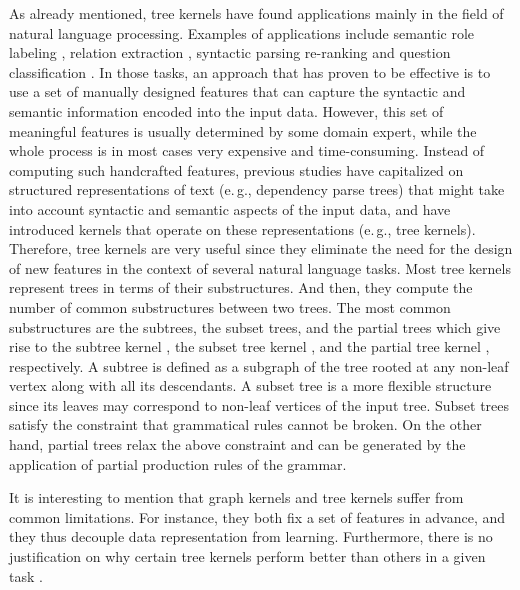 \documentclass[twoside,11pt]{article}
\newcommand{\eg}{e.\,g., }
\begin{document}
As already mentioned, tree kernels have found applications mainly in the field of natural language processing.
Examples of applications include semantic role labeling , relation extraction , syntactic parsing re-ranking  and question classification .
In those tasks, an approach that has proven to be effective is to use a set of manually designed features that can capture the syntactic and semantic information encoded into the input data.
However, this set of meaningful features is usually determined by some domain expert, while the whole process is in most cases very expensive and time-consuming.
Instead of computing such handcrafted features, previous studies have capitalized on structured representations of text (\eg dependency parse trees) that might take into account syntactic and semantic aspects of the input data, and have introduced kernels that operate on these representations (\eg tree kernels).
Therefore, tree kernels are very useful since they eliminate the need for the design of new features in the context of several natural language tasks.
Most tree kernels represent trees in terms of their substructures.
And then, they compute the number of common substructures between two trees.
The most common substructures are the subtrees, the subset trees, and the partial trees which give rise to the subtree kernel , the subset tree kernel , and the partial tree kernel , respectively.
A subtree is defined as a subgraph of the tree rooted at any non-leaf vertex along with all its descendants.
A subset tree is a more flexible structure since its leaves may correspond to non-leaf vertices of the input tree.
Subset trees satisfy the constraint that grammatical rules cannot be broken.
On the other hand, partial trees relax the above constraint and can be generated by the application of partial production rules of the grammar.

It is interesting to mention that graph kernels and tree kernels suffer from common limitations.
For instance, they both fix a set of features in advance, and they thus decouple data representation from learning.
Furthermore, there is no justification on why certain tree kernels perform better than others in a given task .
\end{document}
